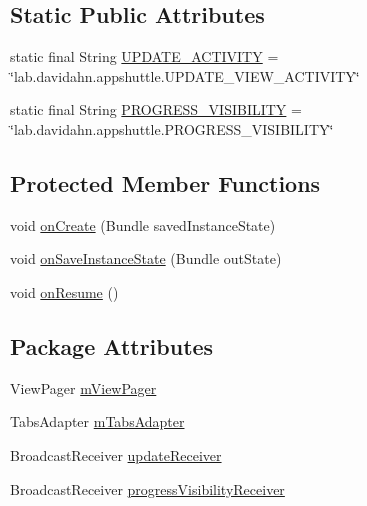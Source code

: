 \subsection*{\-Static \-Public \-Attributes}
\begin{DoxyCompactItemize}
\item 
static final \-String \hyperlink{classlab_1_1davidahn_1_1appshuttle_1_1view_1_1ui_1_1_app_shuttle_main_activity_ab8fff9962a15a493497a543df7633950}{\-U\-P\-D\-A\-T\-E\-\_\-\-A\-C\-T\-I\-V\-I\-T\-Y} = \char`\"{}lab.\-davidahn.\-appshuttle.\-U\-P\-D\-A\-T\-E\-\_\-\-V\-I\-E\-W\-\_\-\-A\-C\-T\-I\-V\-I\-T\-Y\char`\"{}
\item 
static final \-String \hyperlink{classlab_1_1davidahn_1_1appshuttle_1_1view_1_1ui_1_1_app_shuttle_main_activity_aa72e839698cc1b185ae56a39c194ef79}{\-P\-R\-O\-G\-R\-E\-S\-S\-\_\-\-V\-I\-S\-I\-B\-I\-L\-I\-T\-Y} = \char`\"{}lab.\-davidahn.\-appshuttle.\-P\-R\-O\-G\-R\-E\-S\-S\-\_\-\-V\-I\-S\-I\-B\-I\-L\-I\-T\-Y\char`\"{}
\end{DoxyCompactItemize}
\subsection*{\-Protected \-Member \-Functions}
\begin{DoxyCompactItemize}
\item 
void \hyperlink{classlab_1_1davidahn_1_1appshuttle_1_1view_1_1ui_1_1_app_shuttle_main_activity_ae0397191acfb63a40c9e9ab5cfa9ae31}{on\-Create} (\-Bundle saved\-Instance\-State)
\item 
void \hyperlink{classlab_1_1davidahn_1_1appshuttle_1_1view_1_1ui_1_1_app_shuttle_main_activity_a6f60f8bb8fce0ca7396af99e0b975329}{on\-Save\-Instance\-State} (\-Bundle out\-State)
\item 
void \hyperlink{classlab_1_1davidahn_1_1appshuttle_1_1view_1_1ui_1_1_app_shuttle_main_activity_a090fb871baee4806d19ae6aa0dcdb956}{on\-Resume} ()
\end{DoxyCompactItemize}
\subsection*{\-Package \-Attributes}
\begin{DoxyCompactItemize}
\item 
\-View\-Pager \hyperlink{classlab_1_1davidahn_1_1appshuttle_1_1view_1_1ui_1_1_app_shuttle_main_activity_a145b837d229e4761956aaaeec0581bae}{m\-View\-Pager}
\item 
\-Tabs\-Adapter \hyperlink{classlab_1_1davidahn_1_1appshuttle_1_1view_1_1ui_1_1_app_shuttle_main_activity_aeb19a9c0a0154c38c7fc25561cd1ff68}{m\-Tabs\-Adapter}
\item 
\-Broadcast\-Receiver \hyperlink{classlab_1_1davidahn_1_1appshuttle_1_1view_1_1ui_1_1_app_shuttle_main_activity_a704f93e06003d70c2f702dd119199823}{update\-Receiver}
\item 
\-Broadcast\-Receiver \hyperlink{classlab_1_1davidahn_1_1appshuttle_1_1view_1_1ui_1_1_app_shuttle_main_activity_a24eff696f658d9134cb3d4e40d489b83}{progress\-Visibility\-Receiver}
\end{DoxyCompactItemize}


